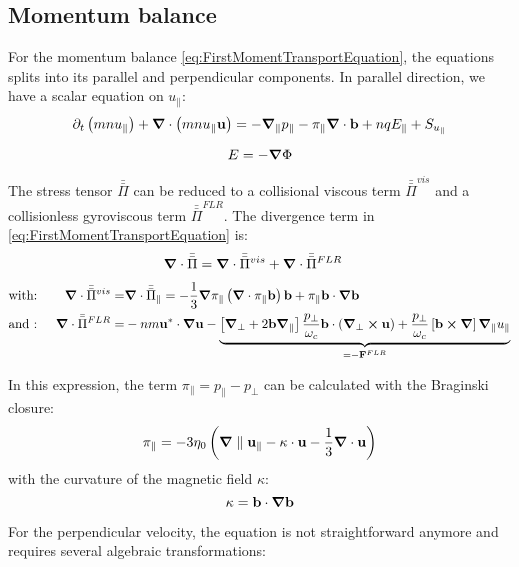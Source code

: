 \subsection{Momentum balance}

For the momentum balance \ref{eq:FirstMomentTransportEquation}, the equations splits into its parallel and perpendicular components. In parallel direction, we have a scalar equation on $u_\parallel$:
\begin{equation}
	\partial_t \left(mnu_\parallel\right) + \grad\cdot\left(mnu_\parallel\mathbf{u}\right) = -\grad_\parallel{p_\parallel} - \pi_\parallel\grad\cdot\mathbf{b} + nqE_\parallel + S_{u_\parallel}
\end{equation}

$$ E = -\grad{\Phi}$$

The stress tensor $\bar{\bar{\Pi}}$ can be reduced to a collisional viscous term $\bar{\bar{\Pi}}^{vis}$ and a collisionless gyroviscous term $\bar{\bar{\Pi}}^{FLR}$. The divergence term in \autoref{eq:FirstMomentTransportEquation} is:  
\begin{align}
	\grad\cdot\bar{\bar{\Pi}} &= \grad\cdot\bar{\bar{\Pi}}^{vis} + \grad\cdot\bar{\bar{\Pi}}^{FLR} 
\end{align}
\begin{align}
	&\text{with: }&\grad\cdot\bar{\bar{\Pi}}^{vis} =& \grad\cdot\bar{\bar{\Pi}}_\parallel = -\frac{1}{3}\grad\pi_\parallel\left(\grad\cdot\pi_\parallel\mathbf{b}\right)\mathbf{b} + \pi_\parallel\mathbf{b}\cdot\grad\mathbf{b} \nonumber\\
	&\text{and : }&\grad\cdot\bar{\bar{\Pi}}^{FLR} =& -nm\mathbf{u}^*\cdot\grad\mathbf{u} - \underbrace{\left[\grad_\perp + 2\mathbf{b}\grad_\parallel\right]\frac{p_\perp}{\omega_c}\mathbf{b}\cdot(\grad_\perp\cross\mathbf{u})+\frac{p_\perp}{\omega_c}\left[\mathbf{b}\cross\grad\right]\grad_\parallel u_\parallel}_{=-\mathbf{F}^{FLR}} \nonumber	
\end{align}

In this expression, the term $\pi_\parallel = p_\parallel - p_\perp$ can be calculated with the Braginski closure:
\begin{equation}
	\pi_\parallel = -3\eta_0\left(\grad\parallel\mathbf{u}_\parallel-\kappa\cdot\mathbf{u}-\frac{1}{3}\grad\cdot\mathbf{u}\right)
\end{equation}
with the curvature of the magnetic field $\kappa$: $$ \kappa = \mathbf{b}\cdot\grad\mathbf{b}$$



For the perpendicular velocity, the equation is not straightforward anymore and requires several algebraic transformations:

